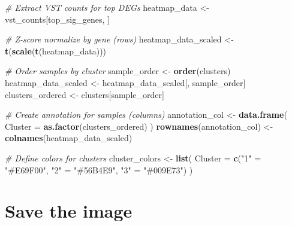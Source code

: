 \documentclass[
]{article}
\newenvironment{Shaded}{\begin{snugshade}}{\end{snugshade}}
\newcommand{\AttributeTok}[1]{\textcolor[rgb]{0.13,0.29,0.53}{#1}}
\newcommand{\CommentTok}[1]{\textcolor[rgb]{0.56,0.35,0.01}{\textit{#1}}}
\newcommand{\FunctionTok}[1]{\textcolor[rgb]{0.13,0.29,0.53}{\textbf{#1}}}
\newcommand{\NormalTok}[1]{#1}
\newcommand{\OtherTok}[1]{\textcolor[rgb]{0.56,0.35,0.01}{#1}}
\newcommand{\StringTok}[1]{\textcolor[rgb]{0.31,0.60,0.02}{#1}}
\begin{document}
\begin{Shaded}
\begin{Highlighting}[]
\CommentTok{\# Extract VST counts for top DEGs}
\NormalTok{heatmap\_data }\OtherTok{\textless{}{-}}\NormalTok{ vst\_counts[top\_sig\_genes, ]}

\CommentTok{\# Z{-}score normalize by gene (rows)}
\NormalTok{heatmap\_data\_scaled }\OtherTok{\textless{}{-}} \FunctionTok{t}\NormalTok{(}\FunctionTok{scale}\NormalTok{(}\FunctionTok{t}\NormalTok{(heatmap\_data)))}

\CommentTok{\# Order samples by cluster}
\NormalTok{sample\_order }\OtherTok{\textless{}{-}} \FunctionTok{order}\NormalTok{(clusters)}
\NormalTok{heatmap\_data\_scaled }\OtherTok{\textless{}{-}}\NormalTok{ heatmap\_data\_scaled[, sample\_order]}
\NormalTok{clusters\_ordered }\OtherTok{\textless{}{-}}\NormalTok{ clusters[sample\_order]}

\CommentTok{\# Create annotation for samples (columns)}
\NormalTok{annotation\_col }\OtherTok{\textless{}{-}} \FunctionTok{data.frame}\NormalTok{(}
  \AttributeTok{Cluster =} \FunctionTok{as.factor}\NormalTok{(clusters\_ordered)}
\NormalTok{)}
\FunctionTok{rownames}\NormalTok{(annotation\_col) }\OtherTok{\textless{}{-}} \FunctionTok{colnames}\NormalTok{(heatmap\_data\_scaled)}

\CommentTok{\# Define colors for clusters}
\NormalTok{cluster\_colors }\OtherTok{\textless{}{-}} \FunctionTok{list}\NormalTok{(}
  \AttributeTok{Cluster =} \FunctionTok{c}\NormalTok{(}\StringTok{"1"} \OtherTok{=} \StringTok{"\#E69F00"}\NormalTok{, }\StringTok{"2"} \OtherTok{=} \StringTok{"\#56B4E9"}\NormalTok{, }\StringTok{"3"} \OtherTok{=} \StringTok{"\#009E73"}\NormalTok{)}
\NormalTok{)}
\end{Highlighting}
\end{Shaded}

\section{Save the image}\label{save-the-image}
\end{document}
